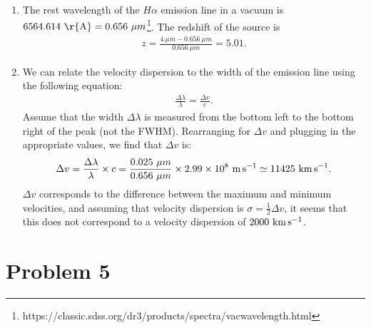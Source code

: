 \documentclass[11pt,letterpaper]{article}
\begin{document}
\begin{enumerate}[label=(\roman*)]
    \item The rest wavelength of the $H\alpha$ emission line in a vacuum is $6564.614~{\rm \r{A}} = 0.656~{\mu m}$\footnote{https://classic.sdss.org/dr3/products/spectra/vacwavelength.html}. The redshift of the source is 
        \begin{align*}
            z = \frac{4~{\mu m} - 0.656~{\mu m}}{0.656~{\mu m}} = 5.01.
        \end{align*}

    \item We can relate the velocity dispersion to the width of the emission line using the following equation:
        \begin{align*}
            \frac{\Delta \lambda}{\lambda} = \frac{\Delta v}{c}.
        \end{align*}
        Assume that the width $\Delta\lambda$ is measured from the bottom left to the bottom right of the peak (not the FWHM). Rearranging for $\Delta v$ and plugging in the appropriate values, we find that $\Delta v$ is:
        \begin{align*}
            \Delta v = \frac{\Delta \lambda}{\lambda}\times c = \frac{0.025~{\mu m}}{0.656~{\mu m}}\times 2.99\times 10^{8}~{\rm m\,s^{-1}} \simeq 11425~{\rm km\,s^{-1}}.
        \end{align*}
        $\Delta v$ corresponds to the difference between the maximum and minimum velocities, and assuming that velocity dispersion is $\sigma = \frac{1}{2}\Delta v$, it seems that this does not correspond to a velocity dispersion of $2000~{\rm km\,s^{-1}}$.

\end{enumerate}

\section*{Problem 5}
\end{document}
